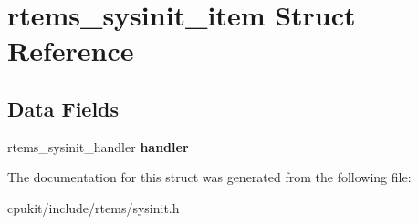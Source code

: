 \hypertarget{structrtems__sysinit__item}{}\section{rtems\+\_\+sysinit\+\_\+item Struct Reference}
\label{structrtems__sysinit__item}
\subsection*{Data Fields}
\begin{DoxyCompactItemize}
\item 
\mbox{\label{structrtems__sysinit__item_a938be72a770b2df428c4ec7df8b61051}} 
rtems\+\_\+sysinit\+\_\+handler {\bfseries handler}
\end{DoxyCompactItemize}


The documentation for this struct was generated from the following file\+:\begin{DoxyCompactItemize}
\item 
cpukit/include/rtems/sysinit.\+h\end{DoxyCompactItemize}
